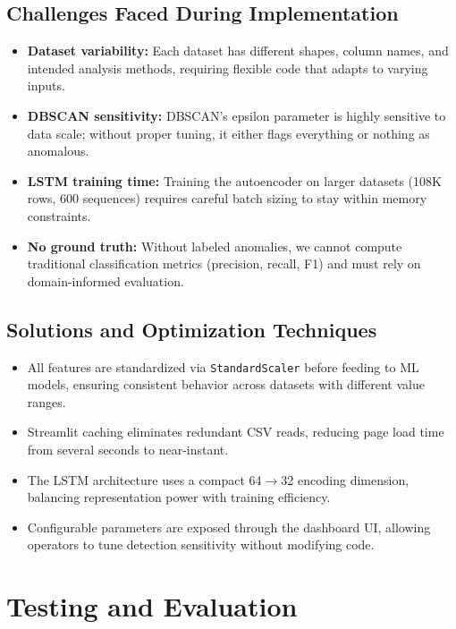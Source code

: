 \documentclass{CLS_zhou430}
\begin{document}
\section{Challenges Faced During Implementation}
\begin{itemize}
    \item \textbf{Dataset variability:} Each dataset has different shapes, column names, and intended analysis methods, requiring flexible code that adapts to varying inputs.
    \item \textbf{DBSCAN sensitivity:} DBSCAN's epsilon parameter is highly sensitive to data scale; without proper tuning, it either flags everything or nothing as anomalous.
    \item \textbf{LSTM training time:} Training the autoencoder on larger datasets (108K rows, 600 sequences) requires careful batch sizing to stay within memory constraints.
    \item \textbf{No ground truth:} Without labeled anomalies, we cannot compute traditional classification metrics (precision, recall, F1) and must rely on domain-informed evaluation.
\end{itemize}

\section{Solutions and Optimization Techniques}
\begin{itemize}
    \item All features are standardized via \texttt{StandardScaler} before feeding to ML models, ensuring consistent behavior across datasets with different value ranges.
    \item Streamlit caching eliminates redundant CSV reads, reducing page load time from several seconds to near-instant.
    \item The LSTM architecture uses a compact 64$\rightarrow$32 encoding dimension, balancing representation power with training efficiency.
    \item Configurable parameters are exposed through the dashboard UI, allowing operators to tune detection sensitivity without modifying code.
\end{itemize}


\chapter{Testing and Evaluation}
\end{document}
